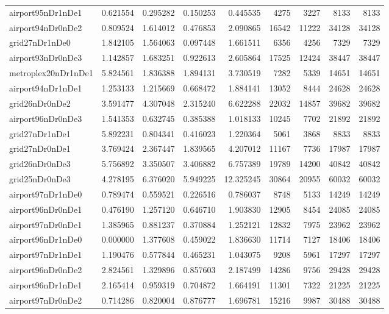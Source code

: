 \begin{longtable}{|l|r|r|r|r|r|r|r|r|}
airport95nDr1nDe1 & 0.621554 & 0.295282 & 0.150253 & 0.445535 & 4275 & 3227 & 8133 & 8133 \\
airport94nDr0nDe2 & 0.809524 & 1.614012 & 0.476853 & 2.090865 & 16542 & 11222 & 34128 & 34128 \\
grid27nDr1nDe0 & 1.842105 & 1.564063 & 0.097448 & 1.661511 & 6356 & 4256 & 7329 & 7329 \\
airport93nDr0nDe3 & 1.142857 & 1.683251 & 0.922613 & 2.605864 & 17525 & 12424 & 38447 & 38447 \\
metroplex20nDr1nDe1 & 5.824561 & 1.836388 & 1.894131 & 3.730519 & 7282 & 5339 & 14651 & 14651 \\
airport94nDr1nDe1 & 1.253133 & 1.215669 & 0.668472 & 1.884141 & 13052 & 8444 & 24628 & 24628 \\
grid26nDr0nDe2 & 3.591477 & 4.307048 & 2.315240 & 6.622288 & 22032 & 14857 & 39682 & 39682 \\
airport96nDr0nDe3 & 1.541353 & 0.632745 & 0.385388 & 1.018133 & 10245 & 7702 & 21892 & 21892 \\
grid27nDr1nDe1 & 5.892231 & 0.804341 & 0.416023 & 1.220364 & 5061 & 3868 & 8833 & 8833 \\
grid27nDr0nDe1 & 3.769424 & 2.367447 & 1.839565 & 4.207012 & 11167 & 7736 & 17987 & 17987 \\
grid26nDr0nDe3 & 5.756892 & 3.350507 & 3.406882 & 6.757389 & 19789 & 14200 & 40842 & 40842 \\
grid25nDr0nDe3 & 4.278195 & 6.376020 & 5.949225 & 12.325245 & 30864 & 20955 & 60032 & 60032 \\
airport97nDr1nDe0 & 0.789474 & 0.559521 & 0.226516 & 0.786037 & 8748 & 5133 & 14249 & 14249 \\
airport96nDr0nDe1 & 0.476190 & 1.257120 & 0.646710 & 1.903830 & 12905 & 8454 & 24085 & 24085 \\
airport97nDr0nDe1 & 1.385965 & 0.881237 & 0.370884 & 1.252121 & 12832 & 7975 & 23962 & 23962 \\
airport96nDr1nDe0 & 0.000000 & 1.377608 & 0.459022 & 1.836630 & 11714 & 7127 & 18406 & 18406 \\
airport97nDr1nDe1 & 1.190476 & 0.577844 & 0.465231 & 1.043075 & 9208 & 5961 & 17297 & 17297 \\
airport96nDr0nDe2 & 2.824561 & 1.329896 & 0.857603 & 2.187499 & 14286 & 9756 & 29428 & 29428 \\
airport96nDr1nDe1 & 2.165414 & 0.959319 & 0.704872 & 1.664191 & 11301 & 7322 & 21225 & 21225 \\
airport97nDr0nDe2 & 0.714286 & 0.820004 & 0.876777 & 1.696781 & 15216 & 9987 & 30488 & 30488 \\

\end{longtable}
